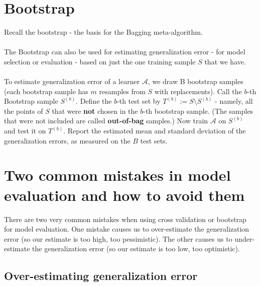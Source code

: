 \documentclass[11pt]{article}
\newcommand{\Ac}{\mathcal{A}}
\begin{document}
\section{Bootstrap}

Recall the bootstrap - the basis for the Bagging meta-algorithm. 
\\~\\
The Bootstrap can also be used for estimating generalization error - for model
selection or evaluation - based on just the one training sample $S$ that we
have. 
\\~\\
To estimate generalization error of a learner $\Ac$, we draw B bootstrap samples
(each bootstrap sample has $m$ resamples from $S$ with replacements). 
Call the $b$-th Bootstrap sample $S^{(b)}$. 
Define the $b$-th test set by 
$T^{(b)}:= S\setminus S^{(b)}$ - namely, all the points of $S$ that were {\bf
not} chosen in the $b$-th bootstrap sample. 
 (The samples that were not included are called {\bf
out-of-bag} samples.)
Now train $\Ac$ on $S^{(b)}$ and
test it on $T^{(b)}$.
 Report the estimated mean and standard deviation of the
generalization errors, as measured on the $B$ test sets. 

\section{Two common mistakes in model evaluation and how to avoid them}

There are two very common mistakes when using cross validation or bootstrap for
model evaluation. 
One mistake causes us to over-estimate the generalization error (so our estimate
is too high, too pessimistic). The other causes us to under-estimate the
generalization error (so our estimate is too low, too optimistic).

\subsection{Over-estimating generalization error}
\end{document}
